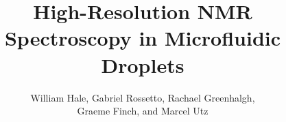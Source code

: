 \documentclass[10pt,titlepage]{article}
\begin{document}
  \title{High-Resolution NMR Spectroscopy in Microfluidic Droplets}
  \author{William Hale, Gabriel Rossetto, Rachael Greenhalgh, \\ Graeme Finch, and Marcel Utz}
  \maketitle
  \begin{abstract}
  
  \end{abstract}

  
\end{document}
